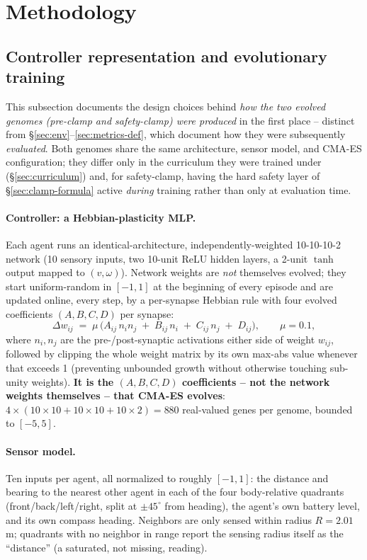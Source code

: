 \documentclass[11pt]{article}
\begin{document}
\section{Methodology}

\subsection{Controller representation and evolutionary training}
\label{sec:evolution}
This subsection documents the design choices behind \emph{how the two evolved genomes
(pre-clamp and safety-clamp) were produced} in the first place -- distinct from
\S\ref{sec:env}--\ref{sec:metrics-def}, which document how they were subsequently
\emph{evaluated}. Both genomes share the same architecture, sensor model, and CMA-ES
configuration; they differ only in the curriculum they were trained under
(\S\ref{sec:curriculum}) and, for safety-clamp, having the hard safety layer of
\S\ref{sec:clamp-formula} active \emph{during} training rather than only at evaluation time.

\paragraph{Controller: a Hebbian-plasticity MLP.} Each agent runs an identical-architecture,
independently-weighted 10-10-10-2 network (10 sensory inputs, two 10-unit ReLU hidden layers,
a 2-unit $\tanh$ output mapped to $(v,\omega)$). Network weights are \emph{not} themselves
evolved; they start uniform-random in $[-1,1]$ at the beginning of every episode and are
updated online, every step, by a per-synapse Hebbian rule with four evolved coefficients
$(A,B,C,D)$ per synapse:
\begin{equation}
\Delta w_{ij} \;=\; \mu \,\big(A_{ij}\, n_i n_j \;+\; B_{ij}\, n_i \;+\; C_{ij}\, n_j \;+\; D_{ij}\big), \qquad \mu = 0.1,
\label{eq:hebbian-update}
\end{equation}
where $n_i, n_j$ are the pre-/post-synaptic activations either side of weight $w_{ij}$, followed
by clipping the whole weight matrix by its own max-abs value whenever that exceeds 1 (preventing
unbounded growth without otherwise touching sub-unity weights). \textbf{It is the $(A,B,C,D)$
coefficients -- not the network weights themselves -- that CMA-ES evolves}: $4 \times (10{\times}10 + 10{\times}10 + 10{\times}2) = 880$ real-valued genes per genome, bounded to $[-5, 5]$.

\paragraph{Sensor model.} Ten inputs per agent, all normalized to roughly $[-1,1]$: the
distance and bearing to the nearest other agent in each of the four body-relative quadrants
(front/back/left/right, split at $\pm45^\circ$ from heading), the agent's own battery level, and
its own compass heading. Neighbors are only sensed within radius $R=2.01$\,m; quadrants with no
neighbor in range report the sensing radius itself as the ``distance'' (a saturated, not
missing, reading).
\end{document}
